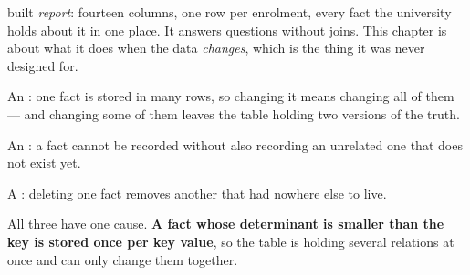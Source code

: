  built \textit{report}: fourteen columns, one row per enrolment,
every fact the university holds about it in one place. It answers questions
without joins. This chapter is about what it does when the data
\emph{changes}, which is the thing it was never designed for.

\begin{definitionbox}
An : one fact is stored in many rows, so changing it means
changing all of them --- and changing some of them leaves the table holding two
versions of the truth.

\smallskip
An : a fact cannot be recorded without also recording
an unrelated one that does not exist yet.

\smallskip
A : deleting one fact removes another that had nowhere
else to live.

\smallskip
All three have one cause. \textbf{A fact whose determinant is smaller than the
key is stored once per key value}, so the table is holding several relations
at once and can only change them together.
\end{definitionbox}

